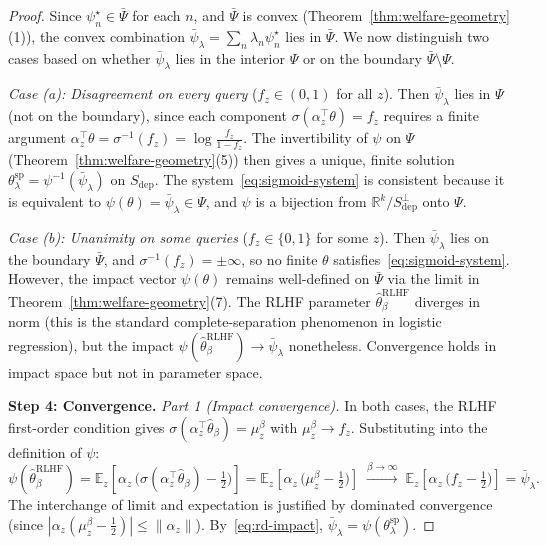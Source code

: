 \begin{proof}
    Since $\psi_n^\star \in \bar{\Psi}$ for each $n$, and $\bar{\Psi}$ 
    is convex (Theorem~\ref{thm:welfare-geometry}(1)), the convex 
    combination $\bar{\psi}_\lambda = \sum_n \lambda_n \psi_n^\star$ 
    lies in $\bar{\Psi}$. We now distinguish two cases based on whether 
    $\bar{\psi}_\lambda$ lies in the interior $\Psi$ or on the 
    boundary $\bar{\Psi} \setminus \Psi$.

    \emph{Case (a): Disagreement on every query} 
    ($f_z \in (0,1)$ for all $z$). 
    Then $\bar{\psi}_\lambda$ lies in $\Psi$ (not on the boundary), 
    since each component $\sigma(\alpha_z^\top \theta) = f_z$ requires 
    a finite argument $\alpha_z^\top \theta = \sigma^{-1}(f_z) 
    = \log\frac{f_z}{1-f_z}$. 
    The invertibility of $\psi$ on $\Psi$ 
    (Theorem~\ref{thm:welfare-geometry}(5)) then gives a unique, 
    finite solution 
    $\theta^{\mathrm{sp}}_\lambda = \psi^{-1}(\bar{\psi}_\lambda)$ 
    on $S_{\mathrm{dep}}$. The system~\eqref{eq:sigmoid-system} 
    is consistent because it is equivalent to 
    $\psi(\theta) = \bar{\psi}_\lambda \in \Psi$, and $\psi$ is 
    a bijection from $\mathbb{R}^k / S_{\mathrm{dep}}^\perp$ onto $\Psi$.

    \emph{Case (b): Unanimity on some queries} 
    ($f_z \in \{0,1\}$ for some $z$). 
    Then $\bar{\psi}_\lambda$ lies on the boundary $\bar{\Psi}$, 
    and $\sigma^{-1}(f_z) = \pm\infty$, so no finite $\theta$ 
    satisfies~\eqref{eq:sigmoid-system}. However, the impact 
    vector $\psi(\theta)$ remains well-defined on $\bar\Psi$ 
    via the limit in Theorem~\ref{thm:welfare-geometry}(7). 
    The RLHF parameter $\hat{\theta}^{\mathrm{RLHF}}_\beta$ 
    diverges in norm (this is the standard complete-separation 
    phenomenon in logistic regression), but the impact 
    $\psi(\hat{\theta}^{\mathrm{RLHF}}_\beta) \to \bar{\psi}_\lambda$ 
    nonetheless. Convergence holds in impact space but not in 
    parameter space.

    \medskip
    \noindent\textbf{Step 4: Convergence.}
    \emph{Part 1 (Impact convergence).} In both cases, the RLHF 
    first-order condition gives 
    $\sigma(\alpha_z^\top \hat\theta_\beta) = \mu_z^\beta$ 
    with $\mu_z^\beta \to f_z$. Substituting into the definition 
    of $\psi$:
    \begin{equation}
        \psi(\hat\theta_\beta^{\mathrm{RLHF}}) 
        = \mathbb{E}_z\!\left[\alpha_z\,
        \bigl(\sigma(\alpha_z^\top \hat\theta_\beta) 
        - \tfrac{1}{2}\bigr)\right]
        = \mathbb{E}_z\!\left[\alpha_z\,
        \bigl(\mu_z^\beta - \tfrac{1}{2}\bigr)\right]
        \;\xrightarrow{\beta \to \infty}\;
        \mathbb{E}_z\!\left[\alpha_z\,
        \bigl(f_z - \tfrac{1}{2}\bigr)\right]
        = \bar{\psi}_\lambda.
    \end{equation}
    The interchange of limit and expectation is justified by 
    dominated convergence (since 
    $|\alpha_z(\mu_z^\beta - \frac{1}{2})| \leq \|\alpha_z\|$). 
    By~\eqref{eq:rd-impact}, $\bar{\psi}_\lambda 
    = \psi(\theta^{\mathrm{sp}}_\lambda)$.


\end{proof}
